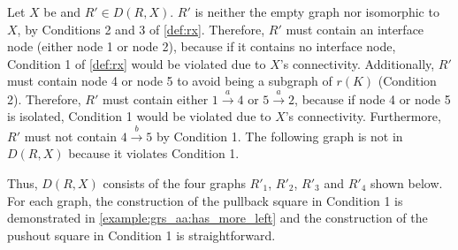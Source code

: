 \begin{example}
\begin{center}
{\begin{tikzpicture}
        \end{tikzpicture}
        }
    \end{center}
    Let $X$ be  and $R' \in D(R,X)$. 
    $R'$ is neither the empty graph nor isomorphic to $X$, by Conditions 2 and 3 of \autoref{def:rx}. 
    Therefore, $R'$ must contain an interface node (either node 1 or node 2), because if it contains no interface node, Condition 1 of \autoref{def:rx} would be violated due to $X$'s connectivity.
    Additionally, $R'$ must contain node 4 or node 5 to avoid being a subgraph of $r(K)$ (Condition 2). 
    Therefore, $R'$ must contain either $1 \overset{a}{\to} 4$ or $5 \overset{a}{\to} 2$, because if node 4 or node 5 is isolated, Condition 1 would be violated due to $X$'s connectivity.
    Furthermore, $R'$ must not contain $4 \overset{b}{\to} 5$ by Condition 1.
    The following graph is not in $D(R,X)$ because it violates Condition 1.
    \begin{center}
    \end{center}
    Thus, $D(R,X)$ consists of the four graphs $R'_1$, $R'_2$, $R'_3$ and $R'_4$ shown below.
    For each graph, the construction of the pullback square in Condition 1 is demonstrated in \autoref{example:grs_aa:has_more_left} and the construction of the pushout square in Condition 1 is straightforward. 
    \begin{center}
\end{center}
\end{example}
